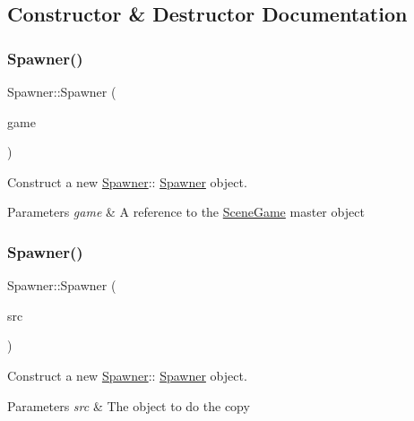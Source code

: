 \subsection{Constructor \& Destructor Documentation}
\mbox{\label{class_spawner_a4272f1d8524f6ea13c576d63b2284069}} 
\subsubsection{\texorpdfstring{Spawner()}{Spawner()}\hspace{0.1cm}{\footnotesize\ttfamily [1/2]}}
{\footnotesize\ttfamily Spawner\+::\+Spawner (\begin{DoxyParamCaption}\item[{\hyperlink{class_scene_game}{Scene\+Game} \&}]{game }\end{DoxyParamCaption})\hspace{0.3cm}{\ttfamily [explicit]}}



Construct a new \hyperlink{class_spawner}{Spawner}\+:\+: \hyperlink{class_spawner}{Spawner} object. 


\begin{DoxyParams}{Parameters}
{\em game} & A reference to the \hyperlink{class_scene_game}{Scene\+Game} master object \\
\hline
\end{DoxyParams}
\mbox{\label{class_spawner_a5e8a4444dd7d67a0cbafeb361cae9e77}} 
\subsubsection{\texorpdfstring{Spawner()}{Spawner()}\hspace{0.1cm}{\footnotesize\ttfamily [2/2]}}
{\footnotesize\ttfamily Spawner\+::\+Spawner (\begin{DoxyParamCaption}\item[{\hyperlink{class_spawner}{Spawner} const \&}]{src }\end{DoxyParamCaption})}



Construct a new \hyperlink{class_spawner}{Spawner}\+:\+: \hyperlink{class_spawner}{Spawner} object. 


\begin{DoxyParams}{Parameters}
{\em src} & The object to do the copy \\
\hline
\end{DoxyParams}



